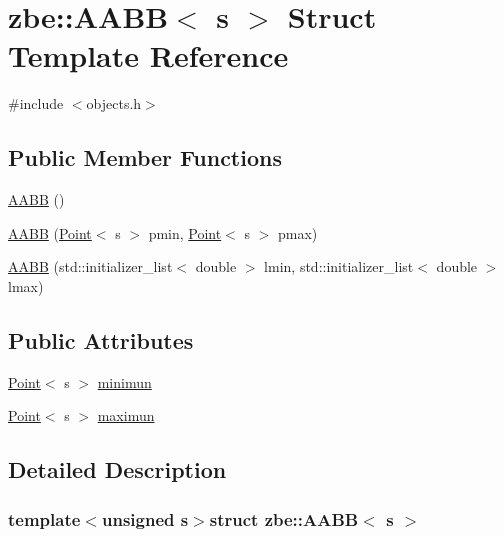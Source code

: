 \hypertarget{structzbe_1_1_a_a_b_b}{}\section{zbe\+:\+:A\+A\+B\+B$<$ s $>$ Struct Template Reference}
\label{structzbe_1_1_a_a_b_b}


{\ttfamily \#include $<$objects.\+h$>$}

\subsection*{Public Member Functions}
\begin{DoxyCompactItemize}
\item 
\hyperlink{structzbe_1_1_a_a_b_b_a52e9f7e1923f419cc8eaa45970fc4f7a}{A\+A\+B\+B} ()
\item 
\hyperlink{structzbe_1_1_a_a_b_b_ab24a55f459a2c201ccefb6ee83b3d3b7}{A\+A\+B\+B} (\hyperlink{classzbe_1_1_point}{Point}$<$ s $>$ pmin, \hyperlink{classzbe_1_1_point}{Point}$<$ s $>$ pmax)
\item 
\hyperlink{structzbe_1_1_a_a_b_b_aeca2fb95e729810b147ad74582ccffd4}{A\+A\+B\+B} (std\+::initializer\+\_\+list$<$ double $>$ lmin, std\+::initializer\+\_\+list$<$ double $>$ lmax)
\end{DoxyCompactItemize}
\subsection*{Public Attributes}
\begin{DoxyCompactItemize}
\item 
\hyperlink{classzbe_1_1_point}{Point}$<$ s $>$ \hyperlink{structzbe_1_1_a_a_b_b_a8a51ab29c910c2f9a0bc91123bcacdad}{minimun}
\item 
\hyperlink{classzbe_1_1_point}{Point}$<$ s $>$ \hyperlink{structzbe_1_1_a_a_b_b_a4e3dfca1b8520673dd2ca4ce152e1c36}{maximun}
\end{DoxyCompactItemize}


\subsection{Detailed Description}
\subsubsection*{template$<$unsigned s$>$struct zbe\+::\+A\+A\+B\+B$<$ s $>$}



